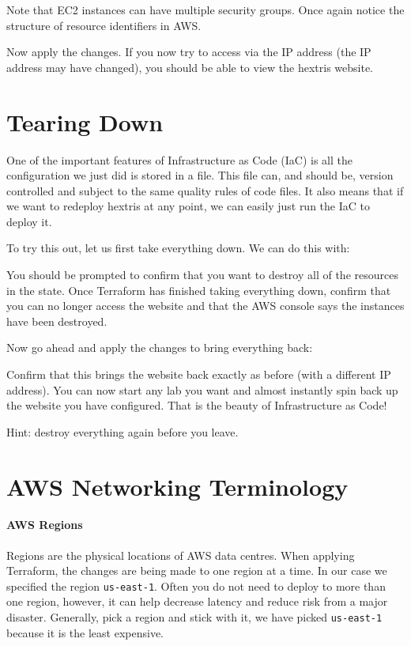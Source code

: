 \documentclass{csse4400}
\begin{document}
Note that EC2 instances can have multiple security groups.
Once again notice the structure of resource identifiers in AWS.


Now apply the changes.
If you now try to access via the IP address
(the IP address may have changed),
you should be able to view the hextris website.

\section{Tearing Down}

One of the important features of Infrastructure as Code (IaC) is all the configuration we just did is stored in a file.
This file can, and should be, version controlled and subject to the same quality rules of code files.
It also means that if we want to redeploy hextris at any point,
we can easily just run the IaC to deploy it.

To try this out, let us first take everything down.
We can do this with:

You should be prompted to confirm that you want to destroy all of the resources in the state.
Once Terraform has finished taking everything down,
confirm that you can no longer access the website and that the AWS console says the instances have been destroyed.

Now go ahead and apply the changes to bring everything back:

Confirm that this brings the website back exactly as before (with a different IP address).
You can now start any lab you want and almost instantly spin back up the website you have configured.
That is the beauty of Infrastructure as Code!

Hint: destroy everything again before you leave.




\appendix

\section{AWS Networking Terminology}
\paragraph{AWS Regions}
Regions are the physical locations of AWS data centres.
When applying Terraform, the changes are being made to one region at a time.
In our case we specified the region \texttt{us-east-1}.
Often you do not need to deploy to more than one region, however,
it can help decrease latency and reduce risk from a major disaster.
Generally, pick a region and stick with it,
we have picked \texttt{us-east-1} because it is the least expensive.
\end{document}
